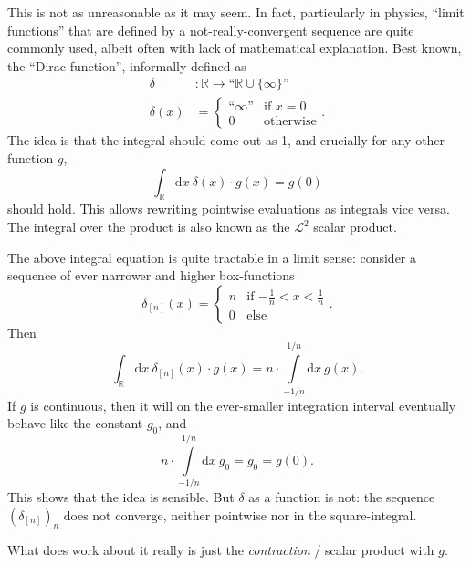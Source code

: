 \documentclass[sigplan,screen]{acmart}
\theoremstyle{acmplain}
\theoremstyle{acmdefinition}
\begin{document}
This is not as unreasonable as it may seem. In fact, par\-ti\-cu\-lar\-ly in physics, “limit functions” that are defined by a not-really-convergent sequence are quite commonly used, albeit often with lack of mathematical explanation. Best known, the “Dirac function”, informally defined as
\begin{align*}
  \delta &\colon \mathbb{R} \to “\mathbb{R}\cup\{\infty\}”
 \\
  \delta(x) &= \begin{cases} “\infty” & \text{if }x=0
                          \\ 0        & \text{otherwise} \end{cases}.
\end{align*}
The idea is that the integral should come out as 1, and crucially for any other function $g$,
\[
  \int_\mathbb{R}\!\mathrm{d}x\: \delta(x)\cdot g(x) = g(0)
\]
should hold. This allows rewriting pointwise evaluations as integrals vice versa. The integral over the product is also known as the $\mathcal{L}^2$ scalar product.

The above integral equation is quite tractable in a limit sense: consider a sequence of ever narrower and higher box-functions
\[
  \delta_{[n]}(x) = \begin{cases}
                           n   & \text{if $-\tfrac1n<x<\tfrac1n$}
                        \\ 0   & \text{else}
                       \end{cases}.
\]
Then
\[
  \int_\mathbb{R}\!\mathrm{d}x\: \delta_{[n]}(x)\cdot g(x)
    = n\cdot\int\limits_{-1/n}^{1/n}\mathrm{d}x\: g(x).
\]
If $g$ is continuous, then it will on the ever-smaller integration interval eventually behave like the constant $g_0$, and
\[
  n\cdot\int\limits_{-1/n}^{1/n}\mathrm{d}x\: g_0 = g_0 = g(0).
\]
This shows that the idea is sensible. But $\delta$ as a function is not: the sequence $(\delta_{[n]})_n$ does not converge, neither pointwise nor in the square-integral.

What does work about it really is just the \emph{contraction} / scalar product with $g$. 
\end{document}
